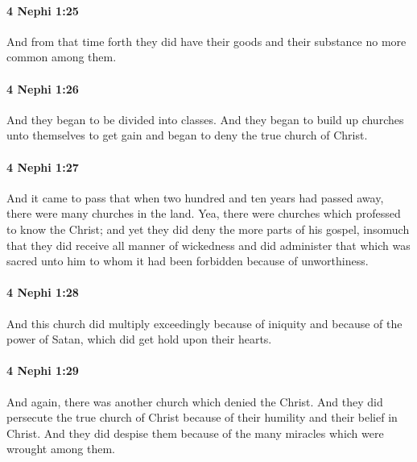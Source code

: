 		\paragraph{4 Nephi 1:25} %
			\label{4NEPHI-1-25}

			And from that time forth they did have their goods and their substance
			no more common among them.

		\paragraph{4 Nephi 1:26} %
			\label{4NEPHI-1-26}

			And they began to be divided into classes.
			And they began to build up churches unto themselves to get gain
			and began to deny the true church of Christ.

		\paragraph{4 Nephi 1:27} %
			\label{4NEPHI-1-27}

			And it came to pass that when two hundred and ten years had passed away,
			there were many churches in the land.
			Yea, there were churches which professed to know the Christ;
			and yet they did deny the more parts of his gospel,
			insomuch that they did receive all manner of wickedness
			and did administer that which was sacred unto him
			to whom it had been forbidden because of unworthiness.

		\paragraph{4 Nephi 1:28} %
			\label{4NEPHI-1-28}

			And this church did multiply exceedingly because of iniquity
			and because of the power of Satan, which did get hold upon their hearts.

		\paragraph{4 Nephi 1:29} %
			\label{4NEPHI-1-29}

			And again, there was another church which denied the Christ.
			And they did persecute the true church of Christ
			because of their humility and their belief in Christ.
			And they did despise them because of the many miracles
			which were wrought among them.

